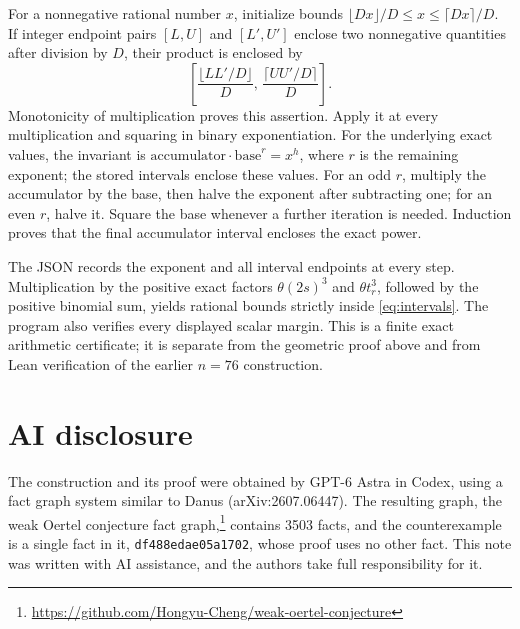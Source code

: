 \documentclass[11pt]{article}
\begin{document}
For a nonnegative rational number $x$, initialize bounds
$\lfloor Dx\rfloor/D\le x\le\lceil Dx\rceil/D$. If integer endpoint
pairs $[L,U]$ and $[L',U']$ enclose two nonnegative quantities after
division by $D$, their product is enclosed by
\[
 \left[\frac{\lfloor LL'/D\rfloor}{D},\,
       \frac{\lceil UU'/D\rceil}{D}\right].
\]
Monotonicity of multiplication proves this assertion. Apply it at every
multiplication and squaring in binary exponentiation. For the underlying
exact values, the invariant is
$\text{accumulator}\cdot\text{base}^{r}=x^h$, where $r$ is the remaining
exponent; the stored intervals enclose these values. For an odd $r$,
multiply the accumulator by the base, then
halve the exponent after subtracting one; for an even $r$, halve it.
Square the base whenever a further iteration is needed. Induction proves
that the final accumulator interval encloses the exact power.

The JSON records the exponent and all interval endpoints at every step.
Multiplication by the positive exact factors $\theta(2s)^3$ and
$\theta t_r^3$, followed by the positive binomial sum, yields rational
bounds strictly inside \eqref{eq:intervals}. The program also verifies
every displayed scalar margin. This is a finite exact arithmetic
certificate; it is separate from the geometric proof above and from
Lean verification of the earlier $n=76$ construction.

\section*{AI disclosure}
The construction and its proof were obtained by GPT-6 Astra in Codex, using a fact
graph system similar to Danus (arXiv:2607.06447). The resulting graph, the weak Oertel
conjecture fact graph,\footnote{\url{https://github.com/Hongyu-Cheng/weak-oertel-conjecture}}
contains 3503 facts, and the counterexample is a single fact in it,
\texttt{df488edae05a1702}, whose proof uses no other fact. This note was written with
AI assistance, and the authors take full responsibility for it.
\end{document}
